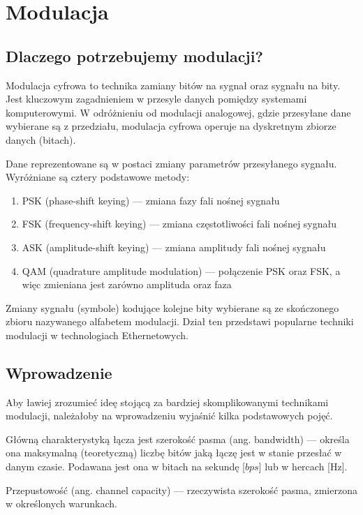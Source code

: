 \section{Modulacja}

\subsection{Dlaczego potrzebujemy modulacji?}

Modulacja cyfrowa to technika zamiany bitów na sygnał oraz sygnału na bity. Jest kluczowym zagadnieniem w przesyle danych pomiędzy systemami komputerowymi. W odróżnieniu od modulacji analogowej, gdzie przesyłane dane wybierane są z przedziału,
modulacja cyfrowa operuje na dyskretnym zbiorze danych (bitach).

Dane reprezentowane są w postaci zmiany parametrów przesyłanego sygnału. Wyróżniane są cztery podstawowe metody:

\begin{enumerate}
    \item PSK (phase-shift keying) --- zmiana fazy fali nośnej sygnału
    \item FSK (frequency-shift keying) --- zmiana częstotliwości fali nośnej sygnału
    \item ASK (amplitude-shift keying) --- zmiana amplitudy fali nośnej sygnału
    \item QAM (quadrature amplitude modulation) --- połączenie PSK oraz FSK, a więc zmieniana jest zarówno amplituda oraz faza
\end{enumerate}

Zmiany sygnału (symbole) kodujące kolejne bity wybierane są ze skończonego zbioru nazywanego alfabetem modulacji.
Dział ten przedstawi popularne techniki modulacji w technologiach Ethernetowych.

\subsection{Wprowadzenie}

Aby ławiej zrozumieć ideę stojącą za bardziej skomplikowanymi technikami modulacji, należałoby na wprowadzeniu wyjaśnić kilka podstawowych pojęć.

Główną charakterystyką łącza jest szerokość pasma (ang. bandwidth) --- określa ona maksymalną (teoretyczną) liczbę bitów jaką łączę jest w stanie przesłać w danym czasie. Podawana jest ona w bitach na sekundę [$bps$] lub w hercach [Hz].

Przepustowość (ang. channel capacity) --- rzeczywista szerokość pasma, zmierzona w określonych warunkach.

